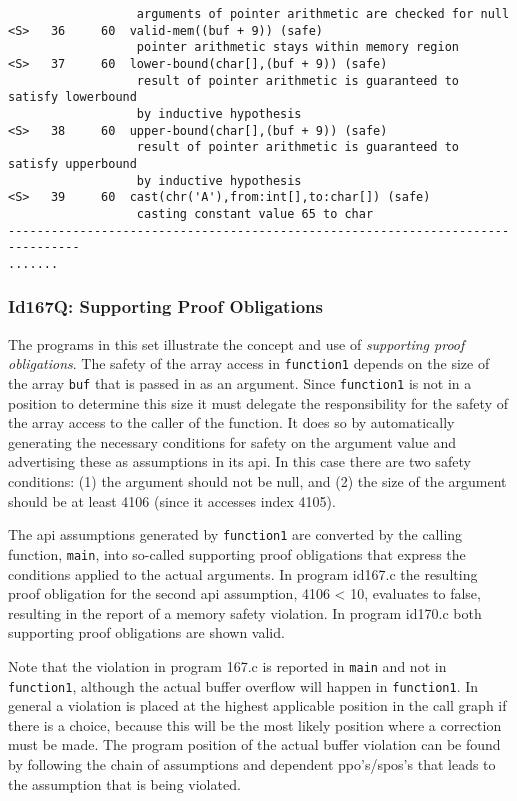\documentclass[11pt]{article}
\begin{document}
\begin{scriptsize}
\begin{verbatim}
                  arguments of pointer arithmetic are checked for null
<S>   36     60  valid-mem((buf + 9)) (safe)
                  pointer arithmetic stays within memory region
<S>   37     60  lower-bound(char[],(buf + 9)) (safe)
                  result of pointer arithmetic is guaranteed to satisfy lowerbound 
                  by inductive hypothesis
<S>   38     60  upper-bound(char[],(buf + 9)) (safe)
                  result of pointer arithmetic is guaranteed to satisfy upperbound 
                  by inductive hypothesis
<S>   39     60  cast(chr('A'),from:int[],to:char[]) (safe)
                  casting constant value 65 to char
--------------------------------------------------------------------------------
.......
\end{verbatim}
\end{scriptsize}

\subsubsection{Id167Q: Supporting Proof Obligations}

The programs in this set illustrate the concept and use of \emph{supporting proof obligations}.
The safety of the array access in {\tt function1} depends on the size of the array {\tt buf} 
that is passed in as an argument. Since {\tt function1} is not in a position to determine 
this size it must delegate the responsibility for the safety of the array access to 
the caller of the function. It does so by automatically generating the necessary 
conditions for safety on the argument value and advertising these as assumptions in 
its api. In this case there are two safety conditions: (1) the argument should not 
be null, and (2) the size of the argument should be at least 4106 (since it 
accesses index 4105).

The api assumptions generated by {\tt function1} are converted by the calling function, 
{\tt main}, into so-called supporting proof obligations that express the conditions 
applied to the actual arguments. In program id167.c the resulting proof obligation 
for the second api assumption, 4106 < 10, evaluates to false, resulting in the 
report of a memory safety violation. In program id170.c both supporting proof 
obligations are shown valid.

Note that the violation in program 167.c is reported in {\tt main} and not in {\tt function1}, 
although the actual buffer overflow will happen in {\tt function1}. In general a 
violation is placed at the highest applicable position in the call graph if there 
is a choice, because this will be the most likely position where a correction 
must be made. The program position of the actual buffer violation can be 
found by following the chain of assumptions and dependent ppo's/spos's that 
leads to the assumption that is being violated.
\end{document}
